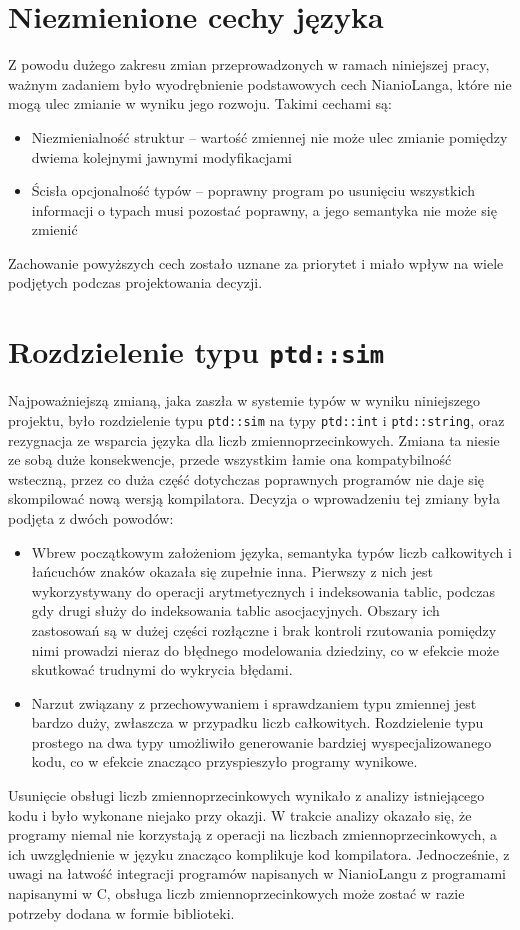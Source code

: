 \documentclass[licencjacka]{pracamgr}
\begin{document}
\section{Niezmienione cechy języka}
Z powodu dużego zakresu zmian przeprowadzonych w ramach niniejszej pracy, ważnym zadaniem było wyodrębnienie
podstawowych cech NianioLanga, które nie mogą ulec zmianie w wyniku jego rozwoju. Takimi cechami są:
\begin{itemize}
 \item Niezmienialność struktur -- wartość zmiennej nie może ulec zmianie pomiędzy dwiema kolejnymi jawnymi
 modyfikacjami
 \item Ścisła opcjonalność typów -- poprawny program po usunięciu wszystkich informacji o typach musi pozostać
 poprawny, a jego semantyka nie może się zmienić
\end{itemize}
Zachowanie powyższych cech zostało uznane za priorytet i miało wpływ na wiele podjętych podczas projektowania
decyzji.

\section{Rozdzielenie typu \texttt{ptd::sim}}
Najpoważniejszą zmianą, jaka zaszła w systemie typów w wyniku niniejszego projektu, było rozdzielenie
typu \texttt{ptd::sim} na typy \texttt{ptd::int} i \texttt{ptd::string}, oraz rezygnacja ze wsparcia
języka dla liczb zmiennoprzecinkowych. Zmiana ta niesie ze sobą duże konsekwencje, przede wszystkim łamie
ona kompatybilność wsteczną, przez co duża część dotychczas poprawnych programów nie daje się skompilować nową
wersją kompilatora. Decyzja o wprowadzeniu tej zmiany była podjęta z dwóch powodów:
\begin{itemize}
 \item Wbrew początkowym założeniom języka, semantyka typów liczb całkowitych i łańcuchów znaków
 okazała się zupełnie inna. Pierwszy z nich jest wykorzystywany do operacji arytmetycznych i indeksowania tablic,
 podczas gdy drugi służy do indeksowania tablic asocjacyjnych. Obszary ich zastosowań są w dużej części rozłączne
 i brak kontroli rzutowania pomiędzy nimi prowadzi nieraz do błędnego modelowania dziedziny, co w efekcie
 może skutkować trudnymi do wykrycia błędami.
 \item Narzut związany z przechowywaniem i sprawdzaniem typu zmiennej jest bardzo duży, zwłaszcza
 w przypadku liczb całkowitych. Rozdzielenie typu prostego na dwa typy umożliwiło generowanie bardziej
 wyspecjalizowanego kodu, co w efekcie znacząco przyspieszyło programy wynikowe.
\end{itemize}
Usunięcie obsługi liczb zmiennoprzecinkowych wynikało z analizy istniejącego kodu i było wykonane niejako
przy okazji. W trakcie analizy okazało się, że programy niemal nie korzystają z operacji na liczbach
zmiennoprzecinkowych, a ich uwzględnienie w języku znacząco komplikuje kod kompilatora. Jednocześnie,
z uwagi na łatwość integracji programów napisanych w NianioLangu z programami napisanymi w C, obsługa
liczb zmiennoprzecinkowych może zostać w razie potrzeby dodana w formie biblioteki.
\end{document}
